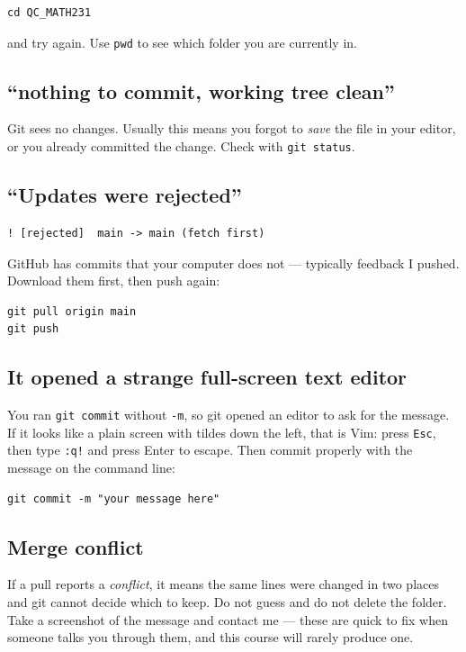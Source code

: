 \documentclass[11pt]{article}
\begin{document}
\begin{lstlisting}
cd QC_MATH231
\end{lstlisting}

\noindent and try again. Use \texttt{pwd} to see which folder you are currently
in.

\subsection{``nothing to commit, working tree clean''}
Git sees no changes. Usually this means you forgot to \emph{save} the file in
your editor, or you already committed the change. Check with
\texttt{git status}.

\subsection{``Updates were rejected''}
\begin{lstlisting}
! [rejected]  main -> main (fetch first)
\end{lstlisting}
GitHub has commits that your computer does not --- typically feedback I pushed.
Download them first, then push again:

\begin{lstlisting}
git pull origin main
git push
\end{lstlisting}

\subsection{It opened a strange full-screen text editor}
You ran \texttt{git commit} without \texttt{-m}, so git opened an editor to ask
for the message. If it looks like a plain screen with tildes down the left, that
is Vim: press \texttt{Esc}, then type \texttt{:q!} and press Enter to escape.
Then commit properly with the message on the command line:

\begin{lstlisting}
git commit -m "your message here"
\end{lstlisting}

\subsection{Merge conflict}\label{ts:conflict}
If a pull reports a \emph{conflict}, it means the same lines were changed in two
places and git cannot decide which to keep. Do not guess and do not delete the
folder. Take a screenshot of the message and contact me --- these are quick to
fix when someone talks you through them, and this course will rarely produce
one.
\end{document}
